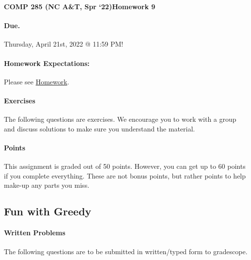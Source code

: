 \documentclass [12pt]{article}
\begin{document}
 

{\LARGE \textbf{COMP 285 (NC A\&T, Spr `22)}\hfill \textbf{Homework 9} } 
\vspace{1em} 
\begin{Instruction} 

\paragraph{Due.} Thursday, April 21st, 2022 @ 11:59 PM!
\end{Instruction} 

\vspace{1em} 
\begin{Instruction} \paragraph{Homework Expectations:} Please see \href{https://www.comp285.ml/homework/#general-homework-information}{Homework}.
\end{Instruction}

\vspace{1em} 
\begin{Instruction} 

\paragraph{Exercises} The following questions are exercises. We encourage you to work with a group and discuss solutions to make sure you understand the material.

\paragraph{Points} This assignment is graded out of 50 points. However, you can get up to 60 points if you complete everything. These are not bonus points, but rather points to help make-up any parts you miss.

\end{Instruction} 

\begin{centering}
\section*{Fun with Greedy}
\end{centering}

\begin{Instruction}

\paragraph{Written Problems} The following questions are to be submitted in written/typed form to gradescope.

\end{Instruction}
\end{document}
